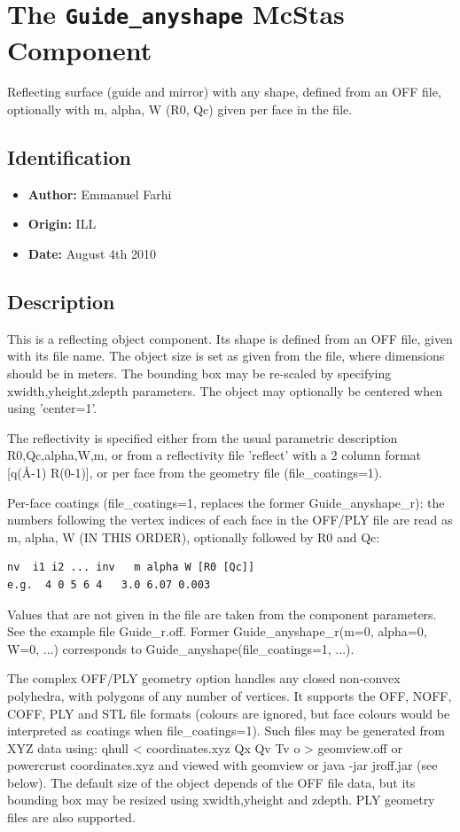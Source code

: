 \section{The \texttt{Guide\_anyshape} McStas Component}
Reflecting surface (guide and mirror) with any shape, defined from an OFF file,
optionally with m, alpha, W (R0, Qc) given per face in the file.

\subsection*{Identification}
\begin{itemize}
  \item \textbf{Author:} Emmanuel Farhi
  \item \textbf{Origin:} ILL
  \item \textbf{Date:} August 4th 2010
\end{itemize}

\subsection*{Description}
This is a reflecting object component. Its shape is defined from an OFF file, given with its file name. The object size is set as given from the file, where dimensions should be in meters. The bounding box may be re-scaled by specifying xwidth,yheight,zdepth parameters. The object may optionally be centered when using 'center=1'.

The reflectivity is specified either from the usual parametric description R0,Qc,alpha,W,m, or from a reflectivity file 'reflect' with a 2 column format [q(\AA{}-1) R(0-1)], or per face from the geometry file (file\_coatings=1).

Per-face coatings (file\_coatings=1, replaces the former Guide\_anyshape\_r): the numbers following the vertex indices of each face in the OFF/PLY file are read as m, alpha, W (IN THIS ORDER), optionally followed by R0 and Qc:

\begin{verbatim}
nv  i1 i2 ... inv   m alpha W [R0 [Qc]]
e.g.  4 0 5 6 4   3.0 6.07 0.003
\end{verbatim}

Values that are not given in the file are taken from the component parameters. See the example file Guide\_r.off. Former Guide\_anyshape\_r(m=0, alpha=0, W=0, ...) corresponds to Guide\_anyshape(file\_coatings=1, ...).

The complex OFF/PLY geometry option handles any closed non-convex polyhedra, with polygons of any number of vertices. It supports the OFF, NOFF, COFF, PLY and STL file formats (colours are ignored, but face colours would be interpreted as coatings when file\_coatings=1). Such files may be generated from XYZ data using: qhull \textless{} coordinates.xyz Qx Qv Tv o \textgreater{} geomview.off or powercrust coordinates.xyz and viewed with geomview or java -jar jroff.jar (see below). The default size of the object depends of the OFF file data, but its bounding box may be resized using xwidth,yheight and zdepth. PLY geometry files are also supported.

